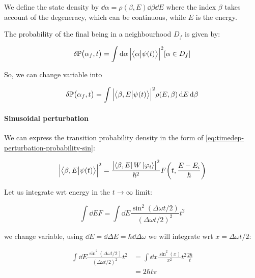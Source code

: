 \documentclass[main.tex]{subfiles}
\begin{document}
We define the state density by \(\dd{\alpha} = \rho(\beta, E ) \dd{\beta} \dd{E} \) where the index \(\beta\) takes account of the degeneracy, which can be continuous, while \(E\) is the energy.

The probability of the final being in a neighbourhood \(D_f\) is given by:

\begin{equation}
    \delta \mathbb{P} \qty(\alpha_f, t)
    = \int   \dd{\alpha} \abs{\braket{\alpha}{\psi(t)} }^2 [\alpha \in D_f]
\end{equation}

So, we can change variable into

\begin{equation}
    \delta \mathbb{P} \qty(\alpha_f, t) = \int  \abs{\braket{\beta, E}{\psi(t)} }^2 \rho(E, \beta)  \dd{E} \dd{\beta}
\end{equation}

\paragraph{Sinusoidal perturbation}

We can express the transition probability density in the form of \eqref{eq:timedep-perturbation-probability-sin}:

\begin{equation}
    \abs{\braket{\beta, E}{\psi(t)} }^2
    = \frac{\abs{\bra{\beta, E} W \ket{\varphi_i}  }^2}{\hbar^2}  F\qty(t, \frac{E-E_i}{\hbar})
\end{equation}

Let us integrate wrt energy in the \(t \rightarrow \infty\) limit:

\begin{equation}
    \int \dd{E} F = \int \dd{E} \frac{\sin^2(\Delta \omega t /2)}{(\Delta \omega t /2)^2}t^2
\end{equation}

we change variable, using \(\dd{E} = \dd{\Delta E} =\hbar \dd{\Delta \omega }\) we will integrate wrt \(x =\Delta \omega t /2 \):

\begin{subequations}
\begin{align}
 \int \dd{E} \frac{\sin^2(\Delta \omega t /2)}{(\Delta \omega t /2)^2} t^2
 &= \int  \dd{x} \frac{\sin^2(x)}{x^2} t^2 \frac{2 \hbar}{t}  \\
 &= 2 \hbar t \pi
\end{align}
\end{subequations}
\end{document}
